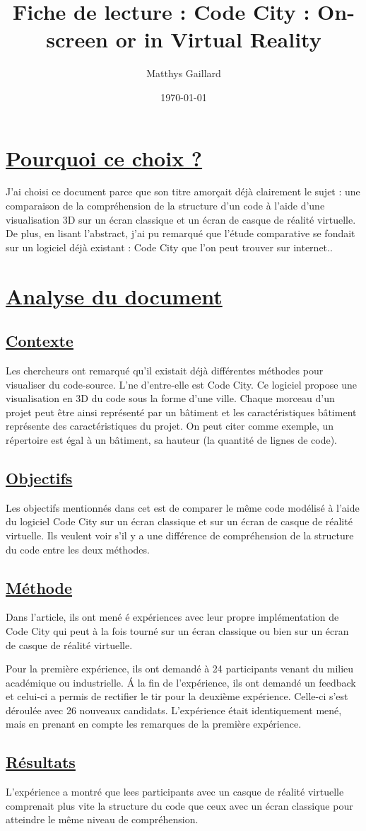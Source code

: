 \documentclass[a4paper,10pt, oneside]{article}
\title{Fiche de lecture : Code City : On-screen or in Virtual Reality}
\author{Matthys Gaillard}
\date{\today}
\begin{document}
\maketitle
\section{\ul{Pourquoi ce choix ?}}
		\par J'ai choisi ce document parce que son titre amorçait déjà clairement le sujet\cite{A8} : une comparaison de la compréhension de la 
		structure d'un code à l'aide d'une visualisation 3D sur un écran classique et un écran de casque de réalité virtuelle. De plus, en lisant l'abstract,
		j'ai pu remarqué que l'étude comparative se fondait sur un logiciel déjà existant : Code City que l'on peut trouver sur internet..
\section{\ul{Analyse du document}}
\subsection{\ul{Contexte}}
		\par Les chercheurs ont remarqué qu'il existait déjà différentes méthodes pour visualiser du code-source. L'ne d'entre-elle est Code City. Ce logiciel
		propose une visualisation en 3D du code sous la forme d'une ville. Chaque morceau d'un projet peut être ainsi représenté par un bâtiment et les caractéristiques
		bâtiment représente des caractéristiques du projet. On peut citer comme exemple, un répertoire est égal à un bâtiment, sa hauteur (la quantité de lignes de code).
\subsection{\ul{Objectifs}}
		\par Les objectifs mentionnés dans cet est de comparer le même code modélisé à l'aide du logiciel Code City sur un écran classique et sur un écran de casque de réalité virtuelle.
		Ils veulent voir s'il y a une différence de compréhension de la structure du code entre les deux méthodes.
\subsection{\ul{Méthode}}
		\par Dans l'article, ils ont mené é expériences avec leur propre implémentation de Code City qui peut à la fois tourné sur un écran classique ou bien sur un écran de casque de réalité virtuelle.
		\par Pour la première expérience, ils ont demandé à 24 participants venant du milieu académique ou industrielle. Á la fin de l'expérience, ils ont demandé un feedback et celui-ci a permis de rectifier le tir 
		pour la deuxième expérience. Celle-ci s'est déroulée avec 26 nouveaux candidats. L'expérience était identiquement mené, mais en prenant en compte les remarques de la première expérience.
\subsection{\ul{Résultats}}
		\par L'expérience a montré que lees participants avec un casque de réalité virtuelle comprenait plus vite la structure du code que ceux avec un écran classique pour atteindre le même niveau de compréhension.
\newpage

 
\end{document}
